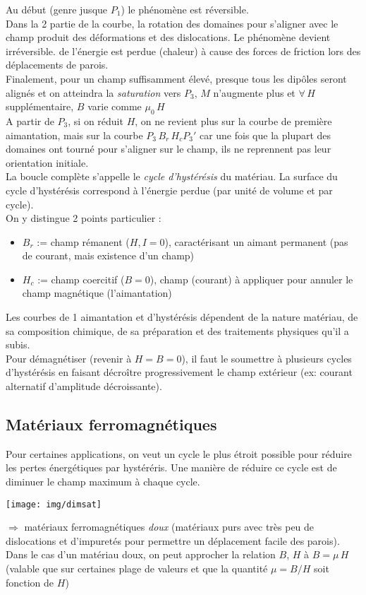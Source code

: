 \documentclass	[11pt, a4paper, openany]{book}
\begin{document}
Au début (genre jusque $P_1$) le phénomène est réversible.\\
Dans la 2 partie de la courbe, la rotation des domaines pour s'aligner avec le champ produit des déformations et des dislocations. Le phénomène  devient irréversible. de l'énergie est perdue (chaleur) à cause des forces de friction lors des déplacements de parois.\\

Finalement, pour un champ suffisamment élevé, presque tous les dipôles seront alignés et on atteindra la \textit{saturation} vers $P_3$, $M$ n'augmente plus et $\forall\, H$ supplémentaire, $B$ varie comme $\mu_0\,H$\\

A partir de $P_3$, si on réduit $H$, on ne revient plus sur la courbe de première aimantation, mais sur la courbe $P_3\,B_r\,H_c P_3'$ car une fois que la plupart des domaines ont tourné pour s'aligner sur le champ, ils ne reprennent pas leur orientation initiale.\\

La boucle complète s'appelle le \textit{cycle d'hystérésis} du matériau. La surface du cycle d'hystérésis correspond à l'énergie perdue (par unité de volume et par cycle).\\
On y distingue 2 points particulier :\begin{itemize}
\item $B_r$ := champ rémanent ($H,I=0$), caractérisant un aimant permanent (pas de courant, mais existence d'un champ)
\item $H_c$ := champ coercitif ($B=0$), champ (courant) à appliquer pour annuler le champ magnétique (l'aimantation)
\end{itemize}
Les courbes de 1 aimantation et d'hystérésis dépendent de la nature matériau, de sa composition chimique, de sa préparation et des traitements physiques qu'il a subis.\\

Pour démagnétiser (revenir à $H=B=0$), il faut le soumettre à plusieurs cycles d'hystérésis en faisant décroître progressivement le champ extérieur (ex: courant alternatif d'amplitude décroissante).

\subsection{Matériaux ferromagnétiques}
Pour certaines applications, on veut un cycle le plus étroit possible pour réduire les pertes énergétiques par hystéréris. Une manière de réduire ce cycle est de diminuer le champ maximum à chaque cycle. \begin{center}
\texttt{[image: img/dimsat]}
\end{center}
$\Rightarrow$ matériaux ferromagnétiques \textit{doux} (matériaux purs avec très peu de dislocations et d'impuretés pour permettre un déplacement facile des parois).\\
Dans le cas d'un matériau doux, on peut approcher la relation $B$, $H$ à $B=\mu\,H$ (valable que sur certaines plage de valeurs et que la quantité $\mu=B/H$ soit fonction de $H$)\\
\end{document}
